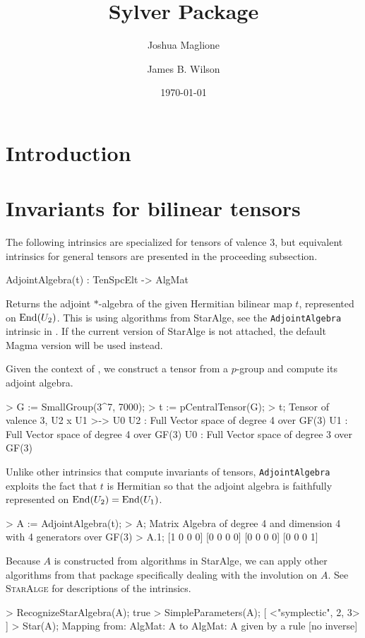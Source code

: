 \documentclass{documentation}
\title{Sylver Package}
\author{Joshua Maglione}
\author{James B. Wilson}
\date{\today}
\begin{document}
\frontmatter

\dominitoc
\maketitle
\tableofcontents

\mainmatter

\chapter{Introduction}



\chapter{Invariants for bilinear tensors}

The following intrinsics are specialized for tensors of valence 3, but equivalent intrinsics for general tensors are presented in the proceeding subsection.

\begin{intrinsics}
AdjointAlgebra(t) : TenSpcElt -> AlgMat
\end{intrinsics}

Returns the adjoint $*$-algebra of the given Hermitian bilinear map $t$, represented on $\operatorname{End}(U_2)$. 
This is using algorithms from {\sc StarAlge}, see the \texttt{AdjointAlgebra} intrinsic in \cite{BW:StarAlge}.
If the current version of {\sc StarAlge} is not attached, the default {\sc Magma} version will be used instead.

\begin{example}[AdjointAlge]

Given the context of \cite{BW:isometry}, we construct a tensor from a $p$-group and compute its adjoint algebra.
\begin{code}
> G := SmallGroup(3^7, 7000);
> t := pCentralTensor(G);
> t;
Tensor of valence 3, U2 x U1 >-> U0
U2 : Full Vector space of degree 4 over GF(3)
U1 : Full Vector space of degree 4 over GF(3)
U0 : Full Vector space of degree 3 over GF(3)
\end{code}

Unlike other intrinsics that compute invariants of tensors, \texttt{AdjointAlgebra} exploits the fact that $t$ is Hermitian so that the adjoint algebra is faithfully represented on $\operatorname{End}(U_2)=\operatorname{End}(U_1)$. 
\begin{code}
> A := AdjointAlgebra(t);
> A;
Matrix Algebra of degree 4 and dimension 4 with 4 generators over GF(3)
> A.1;
[1 0 0 0]
[0 0 0 0]
[0 0 0 0]
[0 0 0 1]
\end{code}

Because $A$ is constructed from algorithms in {\sc StarAlge}, we can apply other algorithms from that package specifically dealing with the involution on $A$.
See \textsc{StarAlge} \cite{BW:StarAlge} for descriptions of the intrinsics.
\begin{code}
> RecognizeStarAlgebra(A);
true
> SimpleParameters(A);
[ <"symplectic", 2, 3> ]
> Star(A);
Mapping from: AlgMat: A to AlgMat: A given by a rule [no inverse]
\end{code}
\end{example}
\end{document}
